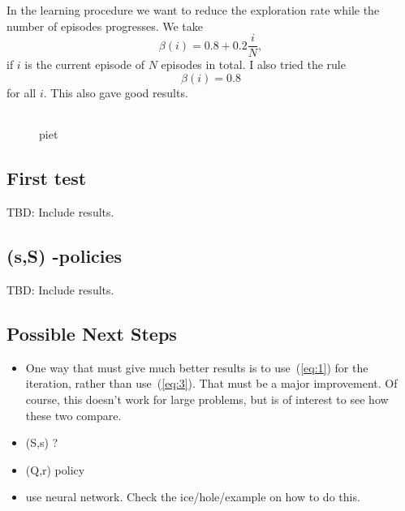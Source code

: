 \documentclass{article}
\begin{document}
In the learning procedure we want to reduce the exploration rate while the number of episodes progresses. We take
\begin{equation*}
  \beta(i) = 0.8 + 0.2\frac i N,
\end{equation*}
if $i$ is the current episode of $N$ episodes in total. I also tried the rule
\begin{equation*}
  \beta(i) = 0.8 
\end{equation*}
for all $i$. This also gave good results.


\begin{figure}[tb]
  \centering
  \begin{tabular}[h]{cc}
  \end{tabular}
  \caption{piet}
\end{figure}


% 

\subsection{First test}

TBD: Include results.

\subsection{(s,S) -policies}
\label{sec:s-s-policies}

TBD: Include results.


\subsection{Possible Next Steps}
\label{sec:next-steps}


\begin{itemize}
\item One way that must give much better results is to use~(\ref{eq:1}) for the iteration, rather than use~(\ref{eq:3}). That must be a major improvement. Of course, this doesn't work for large problems, but is of interest to see how these two compare.
\item (S,s) ?
\item (Q,r) policy
\item use neural network. Check the ice/hole/example on how to do this. 
\end{itemize}
\end{document}
